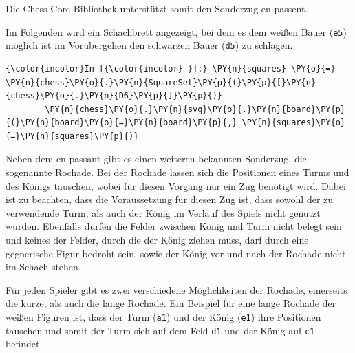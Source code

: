     Die Chess-Core Bibliothek unterstützt somit den Sonderzug en passent.

Im Folgenden wird ein Schachbrett angezeigt, bei dem es dem weißen Bauer
(\texttt{e5}) möglich ist im Vorübergehen den schwarzen Bauer
(\texttt{d5}) zu schlagen.

    \begin{Verbatim}[commandchars=\\\{\}]
{\color{incolor}In [{\color{incolor} }]:} \PY{n}{squares} \PY{o}{=} \PY{n}{chess}\PY{o}{.}\PY{n}{SquareSet}\PY{p}{(}\PY{p}{[}\PY{n}{chess}\PY{o}{.}\PY{n}{D6}\PY{p}{]}\PY{p}{)}
        \PY{n}{chess}\PY{o}{.}\PY{n}{svg}\PY{o}{.}\PY{n}{board}\PY{p}{(}\PY{n}{board}\PY{o}{=}\PY{n}{board}\PY{p}{,} \PY{n}{squares}\PY{o}{=}\PY{n}{squares}\PY{p}{)} 
\end{Verbatim}


    Neben dem en passant gibt es einen weiteren bekannten Sonderzug, die
sogenannte Rochade. Bei der Rochade lassen sich die Positionen eines
Turms und des Königs tauschen, wobei für diesen Vorgang nur ein Zug
benötigt wird. Dabei ist zu beachten, dass die Voraussetzung für diesen
Zug ist, dass sowohl der zu verwendende Turm, als auch der König im
Verlauf des Spiels nicht genutzt wurden. Ebenfalls dürfen die Felder
zwischen König und Turm nicht belegt sein und keines der Felder, durch
die der König ziehen muss, darf durch eine gegnerische Figur bedroht
sein, sowie der König vor und nach der Rochade nicht im Schach stehen.

Für jeden Spieler gibt es zwei verschiedene Möglichkeiten der Rochade,
einerseits die kurze, als auch die lange Rochade. Ein Beispiel für eine
lange Rochade der weißen Figuren ist, dass der Turm (\texttt{a1}) und
der König (\texttt{e1}) ihre Positionen tauschen und somit der Turm sich
auf dem Feld \texttt{d1} und der König auf \texttt{c1} befindet.

